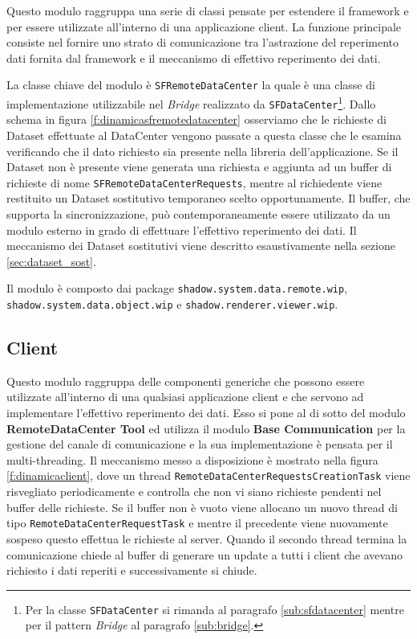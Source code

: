 Questo modulo raggruppa una serie di classi pensate per estendere il framework e per essere utilizzate all'interno di una applicazione client.
La funzione principale consiste nel fornire uno strato di comunicazione tra l'astrazione del reperimento dati fornita dal framework e il meccanismo di effettivo reperimento dei dati.

La classe chiave del modulo \`e \texttt{SFRemoteDataCenter} la quale \`e una classe di implementazione utilizzabile nel \textit{Bridge} realizzato da \texttt{SFDataCenter}\footnote{Per la classe \texttt{SFDataCenter} si rimanda al paragrafo \ref{sub:sfdatacenter} mentre per il pattern \textit{Bridge} al paragrafo \ref{sub:bridge}.}.
Dallo schema in figura \ref{f:dinamicasfremotedatacenter} osserviamo che le richieste di Dataset effettuate al DataCenter vengono passate a questa classe che le esamina verificando che il dato richiesto sia presente nella libreria dell'applicazione. Se il Dataset non \`e presente viene generata una richiesta e aggiunta ad un buffer di richieste di nome \texttt{SFRemoteDataCenterRequests}, mentre al richiedente viene restituito un Dataset sostitutivo temporaneo scelto opportunamente. Il buffer, che supporta la sincronizzazione, pu\`o contemporaneamente essere utilizzato da un modulo esterno in grado di effettuare l'effettivo reperimento dei dati.
Il meccanismo dei Dataset sostitutivi viene descritto esaustivamente nella sezione \ref{sec:dataset_sost}.

Il modulo \`e composto dai package \texttt{shadow.system.data.remote.wip}, \texttt{shadow.system.data.object.wip} e \texttt{shadow.renderer.viewer.wip}.

\subsection{Client}
\label{sub:clientmodule}
Questo modulo raggruppa delle componenti generiche che possono essere utilizzate all'interno di una qualsiasi applicazione client e che servono ad implementare l'effettivo reperimento dei dati. 
Esso si pone al di sotto del modulo \textbf{RemoteDataCenter Tool} ed utilizza il modulo \textbf{Base Communication} per la gestione del canale di comunicazione e la sua implementazione \`e pensata per il multi-threading.
Il meccanismo messo a disposizione \`e mostrato nella figura \ref{f:dinamicaclient}, dove un thread \texttt{RemoteDataCenterRequestsCreationTask} viene risvegliato periodicamente e controlla che non vi siano richieste pendenti nel buffer delle richieste. Se il buffer non \`e vuoto viene allocano un nuovo thread di tipo \texttt{RemoteDataCenterRequestTask} e mentre il precedente viene nuovamente sospeso questo effettua le richieste al server. Quando il secondo thread termina la comunicazione chiede al buffer di generare un update a tutti i client che avevano richiesto i dati reperiti e successivamente si chiude.


